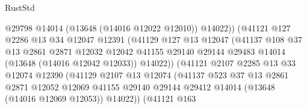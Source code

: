 \begin{lexlean}{RustStd}
\begin{coremodule}
                                    @29798
                                    @14014
                                    (@13648 (@14016 @12022 @12010))
                                    @14022))
                                (@41121
                                  @127
                                  @2286
                                  @13
                                  @34
                                  @12047
                                  @12391
                                  (@41129
                                    @127
                                    @13
                                    @12047
                                    (@41137
                                      @108
                                      @37
                                      @13
                                      @2861
                                      @2871
                                      @12032
                                      @12042
                                      @41155
                                      @29140
                                      @29144
                                      @29483
                                      @14014
                                      (@13648 (@14016 @12042 @12033))
                                      @14022))
                                  (@41121
                                    @2107
                                    @2285
                                    @13
                                    @33
                                    @12074
                                    @12390
                                    (@41129
                                      @2107
                                      @13
                                      @12074
                                      (@41137
                                        @523
                                        @37
                                        @13
                                        @2861
                                        @2871
                                        @12052
                                        @12069
                                        @41155
                                        @29140
                                        @29144
                                        @29412
                                        @14014
                                        (@13648 (@14016 @12069 @12053))
                                        @14022))
                                    (@41121
                                      @163

\end{coremodule}
\end{lexlean}
